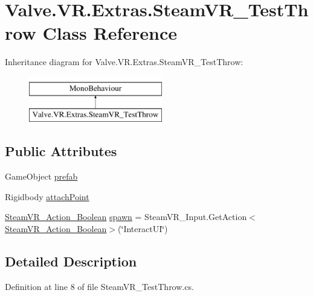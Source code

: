 \hypertarget{class_valve_1_1_v_r_1_1_extras_1_1_steam_v_r___test_throw}{}\section{Valve.\+V\+R.\+Extras.\+Steam\+V\+R\+\_\+\+Test\+Throw Class Reference}
\label{class_valve_1_1_v_r_1_1_extras_1_1_steam_v_r___test_throw}
Inheritance diagram for Valve.\+V\+R.\+Extras.\+Steam\+V\+R\+\_\+\+Test\+Throw\+:\begin{figure}[H]
\begin{center}
\leavevmode
\includegraphics[height=2.000000cm]{class_valve_1_1_v_r_1_1_extras_1_1_steam_v_r___test_throw}
\end{center}
\end{figure}
\subsection*{Public Attributes}
\begin{DoxyCompactItemize}
\item 
Game\+Object \mbox{\hyperlink{class_valve_1_1_v_r_1_1_extras_1_1_steam_v_r___test_throw_a7c18e05c94ca48194ceba72faf8107e7}{prefab}}
\item 
Rigidbody \mbox{\hyperlink{class_valve_1_1_v_r_1_1_extras_1_1_steam_v_r___test_throw_acc9402353f3d39517b0b4a9bd4a01bb0}{attach\+Point}}
\item 
\mbox{\hyperlink{class_valve_1_1_v_r_1_1_steam_v_r___action___boolean}{Steam\+V\+R\+\_\+\+Action\+\_\+\+Boolean}} \mbox{\hyperlink{class_valve_1_1_v_r_1_1_extras_1_1_steam_v_r___test_throw_ad42383e28568def64bda4ac349af0e09}{spawn}} = Steam\+V\+R\+\_\+\+Input.\+Get\+Action$<$\mbox{\hyperlink{class_valve_1_1_v_r_1_1_steam_v_r___action___boolean}{Steam\+V\+R\+\_\+\+Action\+\_\+\+Boolean}}$>$(\char`\"{}Interact\+UI\char`\"{})
\end{DoxyCompactItemize}


\subsection{Detailed Description}


Definition at line 8 of file Steam\+V\+R\+\_\+\+Test\+Throw.\+cs.



